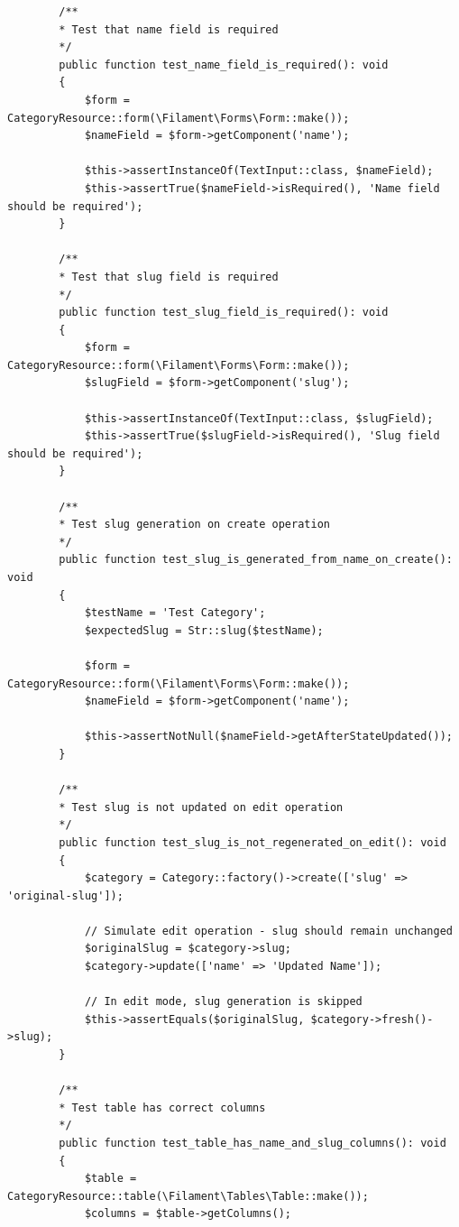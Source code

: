 \begin{verbatim}
        /**
        * Test that name field is required
        */
        public function test_name_field_is_required(): void
        {
            $form = CategoryResource::form(\Filament\Forms\Form::make());
            $nameField = $form->getComponent('name');
            
            $this->assertInstanceOf(TextInput::class, $nameField);
            $this->assertTrue($nameField->isRequired(), 'Name field should be required');
        }
        
        /**
        * Test that slug field is required
        */
        public function test_slug_field_is_required(): void
        {
            $form = CategoryResource::form(\Filament\Forms\Form::make());
            $slugField = $form->getComponent('slug');
            
            $this->assertInstanceOf(TextInput::class, $slugField);
            $this->assertTrue($slugField->isRequired(), 'Slug field should be required');
        }
        
        /**
        * Test slug generation on create operation
        */
        public function test_slug_is_generated_from_name_on_create(): void
        {
            $testName = 'Test Category';
            $expectedSlug = Str::slug($testName);
            
            $form = CategoryResource::form(\Filament\Forms\Form::make());
            $nameField = $form->getComponent('name');
            
            $this->assertNotNull($nameField->getAfterStateUpdated());
        }
        
        /**
        * Test slug is not updated on edit operation
        */
        public function test_slug_is_not_regenerated_on_edit(): void
        {
            $category = Category::factory()->create(['slug' => 'original-slug']);
            
            // Simulate edit operation - slug should remain unchanged
            $originalSlug = $category->slug;
            $category->update(['name' => 'Updated Name']);
            
            // In edit mode, slug generation is skipped
            $this->assertEquals($originalSlug, $category->fresh()->slug);
        }
        
        /**
        * Test table has correct columns
        */
        public function test_table_has_name_and_slug_columns(): void
        {
            $table = CategoryResource::table(\Filament\Tables\Table::make());
            $columns = $table->getColumns();
            

\end{verbatim}
